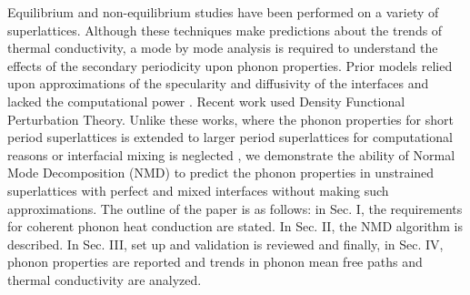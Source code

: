 \newcommand{\lt}{\mspace{-4.0mu}\left(\mspace{-8.0mu}
\begin{smallmatrix}&l\end{smallmatrix}\mspace{-2.0mu};t\right)}

\newcommand{\ltp}{\mspace{-4.0mu}\left(\mspace{-8.0mu}
\begin{smallmatrix}&l'\end{smallmatrix}\mspace{-2.0mu};t\right)}

\newcommand{\lb}{\mspace{-4.0mu}\left(\mspace{-8.0mu}
\begin{smallmatrix}&l \\&b\end{smallmatrix}\mspace{-3.0mu}\right)}

\newcommand{\lbp}{\mspace{-4.0mu}\left(\mspace{-8.0mu}
\begin{smallmatrix}&l' \\&b'\end{smallmatrix}\mspace{-3.0mu}\right)}


Equilibrium \cite {PhysRevB.85.195302} and non-equilibrium \cite {PhysRevB.79.214307,PhysRevB.79.075316,PhysRevB.72.174302} studies have been performed on a variety of superlattices. Although these techniques make predictions about the trends of thermal conductivity, a mode by mode analysis is required to understand the effects of the secondary periodicity upon phonon properties. Prior models relied upon approximations of the specularity and diffusivity of the interfaces \cite {PhysRevB.57.14958} and lacked the computational power \cite {PhysRevB.70.081310}. Recent work \cite{Luckyanova16112012,doi:10.1021/nl202186y} used Density Functional Perturbation Theory. Unlike these works, where the phonon properties for short period superlattices is extended to larger period superlattices for computational reasons \cite{Luckyanova16112012} or interfacial mixing is neglected \cite{doi:10.1021/nl202186y}, we demonstrate the ability of Normal Mode Decomposition (NMD) to predict the phonon properties in unstrained superlattices with perfect and mixed interfaces without making such approximations. The outline of the paper is as follows: in Sec. I, the requirements for coherent phonon heat conduction are stated. In Sec. II, the NMD algorithm is described. In Sec. III, set up and validation is reviewed and finally, in Sec. IV, phonon properties are reported and trends in phonon mean free paths and thermal conductivity are analyzed.

